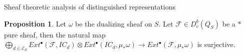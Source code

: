 \documentclass[12pt]{article}
\newcommand{\<}{\langle}
\renewcommand{\>}{\rangle}
\theoremstyle{plain}
\theoremstyle{definition}
\newtheorem{prop}[theorem]{Proposition}
\begin{document}
\begin{section}{Sheaf theoretic analysis of distinguished representations}




     











\begin{prop}\label{orbits must intersect}
    Let $\omega$ be the dualizing sheaf on $S$.
    Let $\mathcal{F}\in D_c^b(Q_S)$ be a $*$ pure sheaf, then the natural map $\bigoplus_{d\in\mathcal{E}_S}Ext^{\bullet}(\mathcal{F},IC_d)\otimes Ext^\bullet(IC_d,\mu_*\omega)\rightarrow Ext^\bullet(\mathcal{F},\mu_*\omega)$ is surjective.
\end{prop}




\end{section}
\end{document}
